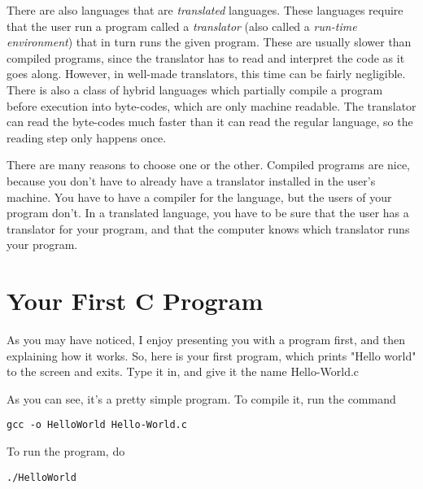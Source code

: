 There are also languages that are \emph{translated}
languages.  These languages require that the user run a program
called a \emph{translator} (also called a 
\emph{run-time environment}) that in turn runs the
given program.  These are usually slower than compiled programs,
since the translator has to read and interpret the code as it goes 
along.  However, in well-made translators, this time can be
fairly negligible.  There is also a class of hybrid languages
which partially compile a program before execution into byte-codes,
which are only machine readable.  The translator can read the
byte-codes much faster than it can read the regular language, so
the reading step only happens once.

There are many reasons to choose one or the other.  Compiled programs
are nice, because you don't have to already have a translator installed
in the user's machine.  You have to have a compiler for the language,
but the users of your program don't.  In a translated language, you
have to be sure that the user has a translator for your program,
and that the computer knows which translator runs your program.

\section{Your First C Program}

As you may have noticed, I enjoy presenting you with a program first,
and then explaining how it works.  So, here is your first program,
which prints "Hello world" to the screen and exits.  Type it in, and
give it the name Hello-World.c

\begin{simpletyping}

\end{simpletyping}

As you can see, it's a pretty simple program.  To compile it,
run the command

\begin{simpletyping}
\begin{lstlisting}
gcc -o HelloWorld Hello-World.c
\end{lstlisting}
\end{simpletyping}

To run the program, do

\begin{simpletyping}
\begin{lstlisting}
./HelloWorld
\end{lstlisting}
\end{simpletyping}

